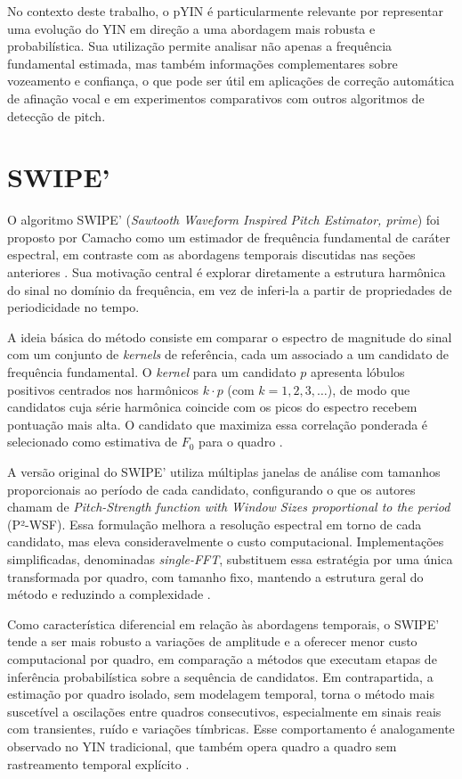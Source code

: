 No contexto deste trabalho, o pYIN é particularmente relevante por representar uma evolução do YIN em direção a uma abordagem mais robusta e probabilística. Sua utilização permite analisar não apenas a frequência fundamental estimada, mas também informações complementares sobre vozeamento e confiança, o que pode ser útil em aplicações de correção automática de afinação vocal e em experimentos comparativos com outros algoritmos de detecção de pitch.

\section{SWIPE'}

O algoritmo SWIPE' (\textit{Sawtooth Waveform Inspired Pitch Estimator, prime}) foi proposto por Camacho como um estimador de frequência fundamental de caráter espectral, em contraste com as abordagens temporais discutidas nas seções anteriores \cite{camacho2008swipe}. Sua motivação central é explorar diretamente a estrutura harmônica do sinal no domínio da frequência, em vez de inferi-la a partir de propriedades de periodicidade no tempo.

A ideia básica do método consiste em comparar o espectro de magnitude do sinal com um conjunto de \textit{kernels} de referência, cada um associado a um candidato de frequência fundamental. O \textit{kernel} para um candidato $p$ apresenta lóbulos positivos centrados nos harmônicos $k \cdot p$ (com $k = 1, 2, 3, \ldots$), de modo que candidatos cuja série harmônica coincide com os picos do espectro recebem pontuação mais alta. O candidato que maximiza essa correlação ponderada é selecionado como estimativa de $F_0$ para o quadro \cite{camacho2008swipe}.

A versão original do SWIPE' utiliza múltiplas janelas de análise com tamanhos proporcionais ao período de cada candidato, configurando o que os autores chamam de \textit{Pitch-Strength function with Window Sizes proportional to the period} (P²-WSF). Essa formulação melhora a resolução espectral em torno de cada candidato, mas eleva consideravelmente o custo computacional. Implementações simplificadas, denominadas \textit{single-FFT}, substituem essa estratégia por uma única transformada por quadro, com tamanho fixo, mantendo a estrutura geral do método e reduzindo a complexidade \cite{camacho2008swipe}.

Como característica diferencial em relação às abordagens temporais, o SWIPE' tende a ser mais robusto a variações de amplitude e a oferecer menor custo computacional por quadro, em comparação a métodos que executam etapas de inferência probabilística sobre a sequência de candidatos. Em contrapartida, a estimação por quadro isolado, sem modelagem temporal, torna o método mais suscetível a oscilações entre quadros consecutivos, especialmente em sinais reais com transientes, ruído e variações tímbricas. Esse comportamento é analogamente observado no YIN tradicional, que também opera quadro a quadro sem rastreamento temporal explícito \cite{decheveigne2002yin}.

